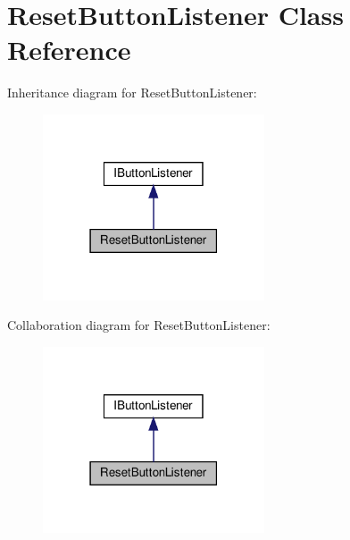 \hypertarget{classResetButtonListener}{}\section{Reset\+Button\+Listener Class Reference}
\label{classResetButtonListener}


Inheritance diagram for Reset\+Button\+Listener\+:
\nopagebreak
\begin{figure}[H]
\begin{center}
\leavevmode
\includegraphics[width=186pt]{classResetButtonListener__inherit__graph}
\end{center}
\end{figure}


Collaboration diagram for Reset\+Button\+Listener\+:
\nopagebreak
\begin{figure}[H]
\begin{center}
\leavevmode
\includegraphics[width=186pt]{classResetButtonListener__coll__graph}
\end{center}
\end{figure}
